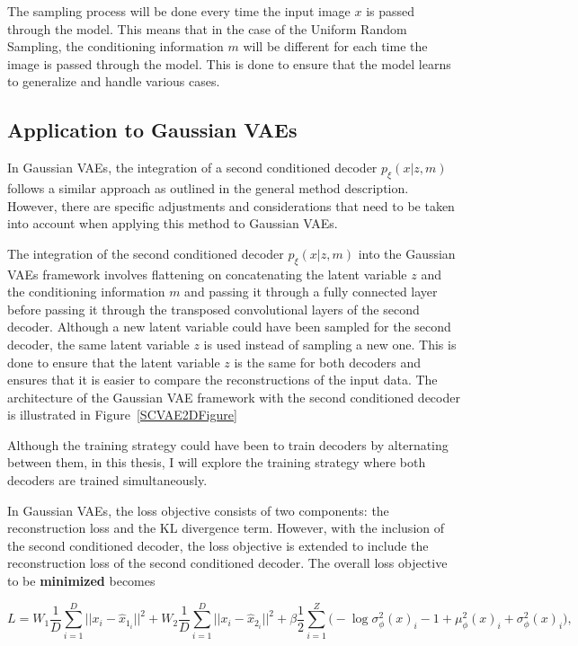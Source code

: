 The sampling process will be done every time the input image $x$ is passed through the model. This means that in the case of the Uniform Random Sampling, the conditioning information $m$ will be different for each time the image is passed through the model. This is done to ensure that the model learns to generalize and handle various cases.

\subsection{Application to Gaussian VAEs}

In Gaussian VAEs, the integration of a second conditioned decoder
$p_\xi(x|z,m)$ follows a similar approach as outlined in the general method
description. However, there are specific adjustments and considerations that
need to be taken into account when applying this method to Gaussian VAEs.

The integration of the second conditioned decoder $p_\xi(x|z,m)$ into the
Gaussian VAEs framework involves flattening on concatenating the latent
variable $z$ and the conditioning information $m$ and passing it through a
fully connected layer before passing it through the transposed convolutional
layers of the second decoder. Although a new latent variable could have
been sampled for the second decoder, the same latent variable $z$ is used
instead of sampling a new one. This is done to ensure that the latent variable
$z$ is the same for both decoders and ensures that it is easier to compare the
reconstructions of the input data. The architecture of the Gaussian
VAE framework with the second conditioned decoder is illustrated in
Figure~\ref{SCVAE2DFigure}

Although the training strategy could have been to train decoders by alternating between them, in this thesis, I will explore the training strategy where both decoders are trained simultaneously.

In Gaussian VAEs, the loss objective consists of two components: the
reconstruction loss and the KL divergence term. However, with the inclusion of
the second conditioned decoder, the loss objective is extended to include the
reconstruction loss of the second conditioned decoder. The overall loss
objective to be \textbf{minimized} becomes

\[ L = W_1 \frac{1}{D} \sum_{i=1}^{D} ||x_i - \hat{x}_{1_{i}} ||^2 + W_2 \frac{1}{D} \sum_{i=1}^{D} || x_i - \hat{x}_{2_{i}} ||^2 + \beta  \frac{1}{2} \sum_{i=1}^{Z} \biggl( -\log \sigma^2_\phi(x)_i - 1 + \mu^2_\phi(x)_i + \sigma^2_\phi(x)_i \biggr), \]

